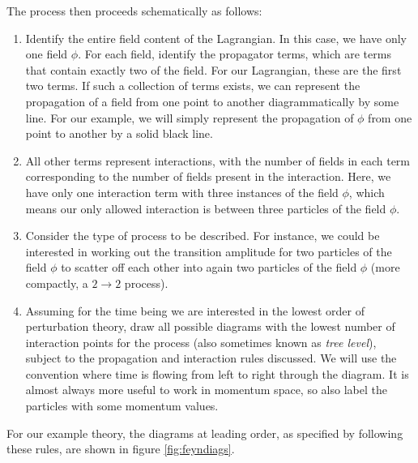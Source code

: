 The process then proceeds schematically as follows: 

\begin{enumerate}
\item{Identify the entire field content of the Lagrangian. In this case, we have only one field $\phi$. For each field, identify the propagator terms, which are terms that contain exactly two of the field. For our Lagrangian, these are the first two terms. If such a collection of terms exists, we can represent the propagation of a field from one point to another diagrammatically by some line. For our example, we will simply represent the propagation of $\phi$ from one point to another by a solid black line.}
\item{All other terms represent interactions, with the number of fields in each term corresponding to the number of fields present in the interaction. Here, we have only one interaction term with three instances of the field $\phi$, which means our only allowed interaction is between three particles of the field $\phi$.}
\item{Consider the type of process to be described. For instance, we could be interested in working out the transition amplitude for two particles of the field $\phi$ to scatter off each other into again two particles of the field $\phi$ (more compactly, a $2 \to 2$ process).}
\item{Assuming for the time being we are interested in the lowest order of perturbation theory, draw all possible diagrams with the lowest number of interaction points for the process (also sometimes known as \emph{tree level}), subject to the propagation and interaction rules discussed. We will use the convention where time is flowing from left to right through the diagram. It is almost always more useful to work in momentum space, so also label the particles with some momentum values. }
\end{enumerate}

For our example theory, the diagrams at leading order, as specified by following these rules, are shown in figure \ref{fig:feyndiags}.  

